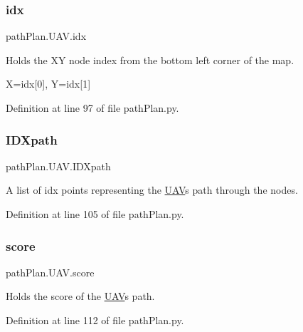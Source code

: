 \subsubsection{\texorpdfstring{idx}{idx}}
{\footnotesize\ttfamily path\+Plan.\+U\+A\+V.\+idx}



Holds the XY node index from the bottom left corner of the map. 

X=idx\mbox{[}0\mbox{]}, Y=idx\mbox{[}1\mbox{]} 

Definition at line 97 of file path\+Plan.\+py.

\mbox{\label{classpath_plan_1_1_u_a_v_a640c0f9f8385d53e0742d9ef5f3a7a59}} 
\subsubsection{\texorpdfstring{I\+D\+Xpath}{IDXpath}}
{\footnotesize\ttfamily path\+Plan.\+U\+A\+V.\+I\+D\+Xpath}



A list of idx points representing the \mbox{\hyperlink{classpath_plan_1_1_u_a_v}{U\+AV}}\textquotesingle{}s path through the nodes. 



Definition at line 105 of file path\+Plan.\+py.

\mbox{\label{classpath_plan_1_1_u_a_v_a5f9c3173062f490e98024972e954cb1c}} 
\subsubsection{\texorpdfstring{score}{score}}
{\footnotesize\ttfamily path\+Plan.\+U\+A\+V.\+score}



Holds the score of the \mbox{\hyperlink{classpath_plan_1_1_u_a_v}{U\+AV}}\textquotesingle{}s path. 



Definition at line 112 of file path\+Plan.\+py.

\mbox{\label{classpath_plan_1_1_u_a_v_a998af53f0d27f93e5ad949a09710f995}} 
